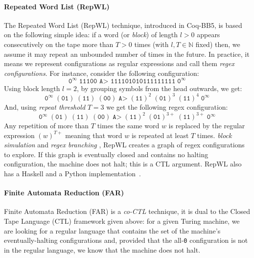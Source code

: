 \documentclass[sigconf,screen]{acmart}
\theoremstyle{definition} %
\numberwithin{equation}{section}
\theoremstyle{definition} %
\newcommand{\szero}{\texttt{0}\xspace}
\newcommand{\CoqBB}{Coq-BB5\xspace}
\begin{document}
\paragraph{Repeated Word List (RepWL)} The Repeated Word List (RepWL) technique, introduced in \CoqBB, is based on the following simple idea: if a word (or \textit{block}) of length $l > 0$ appears consecutively on the tape more than $T > 0$ times (with $l, T \in \mathbb{N}$ fixed) then, we assume it may repeat an unbounded number of times in the future. In practice, it means we represent configurations as regular expressions and call them \textit{regex configurations}. For instance, consider the following configuration:
$$ \texttt{0}^\infty \; \texttt{11100 A> 111101010111111111} \; \texttt{0}^\infty$$
Using block length $l=2$, by grouping symbols from the head outwards, we get:
$$ \texttt{0}^\infty \; (\texttt{01}) \; (\texttt{11}) \; (\texttt{00}) \; \texttt{A>} \; (\texttt{11})^2 \; (\texttt{01})^{3} \; (\texttt{11})^{4} \; \texttt{0}^\infty $$
And, using \textit{repeat threshold} $T=3$ we get the following regex configuration:
$$ \texttt{0}^\infty \; (\texttt{01}) \; (\texttt{11}) \; (\texttt{00}) \; \texttt{A>} \; (\texttt{11})^2 \; (\texttt{01})^{3+} \; (\texttt{11})^{3+} \; \texttt{0}^\infty $$
Any repetition of more than $T$ times the same word $w$ is replaced by the regular expression $(w)^{T+}$ meaning that word $w$ is repeated at least $T$ times.  \textit{block simulation}  and \textit{regex branching} , RepWL creates a graph of regex configurations to explore. If this graph is eventually closed and contains no halting configuration, the machine does not halt; this is a CTL argument.  RepWL also has a Haskell and a Python implementation~\cite{RepWL_haskell,RepWL_python}.

\paragraph{Finite Automata Reduction (FAR)} Finite Automata Reduction (FAR) is a \textit{co-CTL} technique, \ie it is dual to the Closed Tape Language (CTL) framework given above: for a given Turing machine, we are looking for a regular language that contains the set of the machine's eventually-halting configurations and, provided that the all-\szero configuration is not in the regular language, we know that the machine does not halt.
\end{document}
